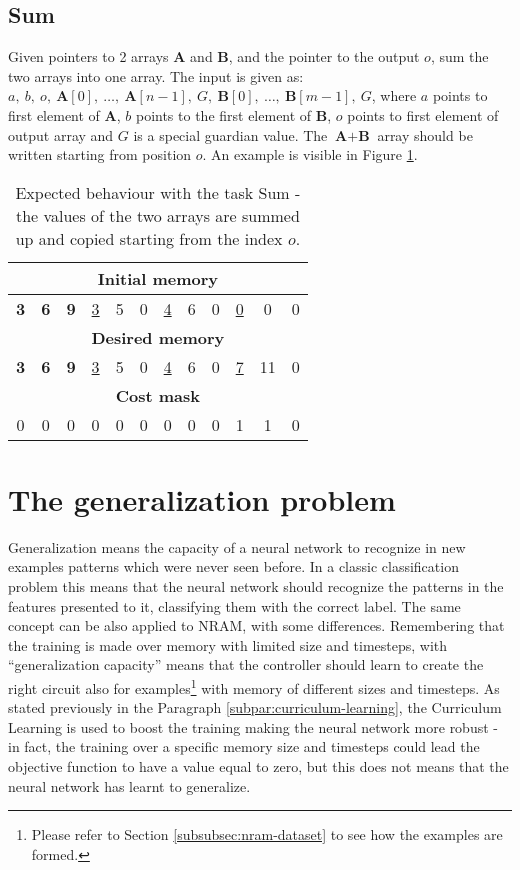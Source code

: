 \subsection{Sum}
Given pointers to 2 arrays \textbf{A} and \textbf{B}, and the pointer to the output $o$, sum the two arrays into one array. The input is given as: $a,\ b,\ o,\ \textbf{A}[0],\ \dots,\ \textbf{A}[n-1],\ G,\ \textbf{B}[0],\ \dots,\ \textbf{B}[m-1],\ G$, where $a$ points to first element of \textbf{A}, $b$ points to the first element of \textbf{B}, $o$ points to first element of output array and $G$ is a special guardian value. The $\textbf{A}+\textbf{B}$ array should be written starting from position $o$. An example is visible in Figure \ref{fig:sum-example}.
\begin{table}[h!]
	\centering
	\begin{tabular}{|c|c|c|c|c|c|c|c|c|c|c|c|}
		\hline
		\multicolumn{12}{|c|}{\textbf{Initial memory}} \\ \hline
		\textbf{3} & \textbf{6} & \textbf{9} & \underline{3} & 5 & 0 & \underline{4} & 6 & 0 & \underline{0} & 0 & 0 \\ \hline\hline\hline
		\multicolumn{12}{|c|}{\textbf{Desired memory}} \\ \hline
		\textbf{3} & \textbf{6} & \textbf{9} & \underline{3} & 5 & 0 & \underline{4} & 6 & 0 & \underline{7} & 11 & 0 \\ \hline\hline\hline
		\multicolumn{12}{|c|}{\textbf{Cost mask}} \\ \hline
		0 & 0 & 0 & 0 & 0 & 0 & 0 & 0 & 0 & 1 & 1 & 0 \\ \hline
	\end{tabular}
	\caption{Expected behaviour with the task Sum - the values of the two arrays are summed up and copied starting from the index $o$.}
	\label{fig:sum-example}
\end{table}
\FloatBarrier

\section{The generalization problem}
Generalization means the capacity of a neural network to recognize in new examples patterns which were never seen before. In a classic classification problem this means that the neural network should recognize the patterns in the features presented to it, classifying them with the correct label. The same concept can be also applied to NRAM, with some differences. Remembering that the training is made over memory with limited size and timesteps, with ``generalization capacity'' means that the controller should learn to create the right circuit also for examples\footnote{Please refer to Section \ref{subsubsec:nram-dataset} to see how the examples are formed.} with memory of different sizes and timesteps. As stated previously in the Paragraph \ref{subpar:curriculum-learning}, the Curriculum Learning is used to boost the training making the neural network more robust - in fact, the training over a specific memory size and timesteps could lead the objective function to have a value equal to zero, but this does not means that the neural network has learnt to generalize.

